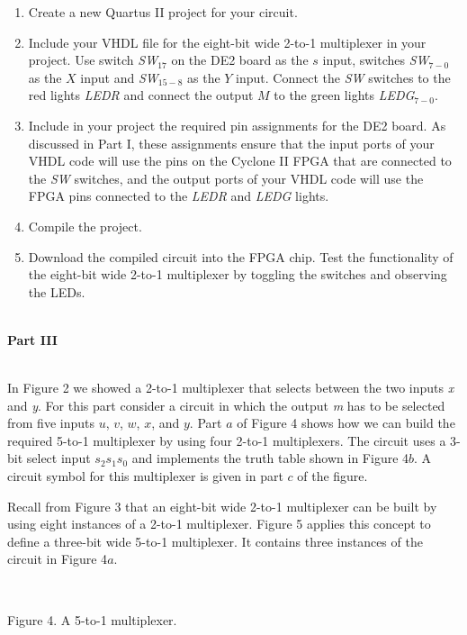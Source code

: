 \documentclass[psfig,10pt,fullpage]{article}
\begin{document}
\begin{enumerate}
\item Create a new Quartus II project for your circuit.
\item Include your VHDL file for the eight-bit wide 2-to-1 multiplexer 
in your project. Use switch {\it SW}$_{17}$ on the DE2 board as the $s$ input, switches
{\it SW}$_{7-0}$ as the $X$ input and 
{\it SW}$_{15-8}$ as the $Y$ input. Connect the {\it SW} switches
to the red lights {\it LEDR} and connect the output $M$ to the green lights {\it LEDG}$_{7-0}$.
\item Include in your project the required pin assignments for the DE2 board. As discussed
in Part I, these 
assignments ensure that the input ports of your VHDL code will use the pins on the Cyclone 
II FPGA that are connected to the {\it SW} switches, and the output ports of your VHDL code
will use the FPGA pins connected to the {\it LEDR} and {\it LEDG} lights. 
\item Compile the project.
\item Download the compiled circuit into the FPGA chip. Test the functionality of the 
eight-bit wide 2-to-1 multiplexer by toggling the switches and observing the LEDs.
\end{enumerate}

~\\
\noindent
{\bf Part III}

~\\
\noindent
In Figure 2 we showed a 2-to-1 multiplexer that selects between the two inputs {\it x} and {\it
y}. For this part consider a circuit in which the output {\it m} has to be selected from
five inputs $u$, $v$, $w$, $x$, and $y$. Part $a$ of Figure 4 shows how we can build the
required 5-to-1 multiplexer by using four 2-to-1 multiplexers. The circuit uses a 3-bit
select input $s_2 s_1 s_0$ and implements the truth table shown in Figure 4$b$. A circuit
symbol for this multiplexer is given in part $c$ of the figure. 

Recall from Figure 3
that an eight-bit wide 2-to-1 multiplexer can be built by using eight instances of a 2-to-1
multiplexer. Figure 5 applies this concept to define a three-bit wide 5-to-1 multiplexer. It
contains three instances of the circuit in Figure 4$a$.

\begin{figure}[H]
\scriptsize
\centerline{
\hbox{}}
\end{figure}
~\\
\centerline{Figure 4.  A 5-to-1 multiplexer.}
~\\
\end{document}
